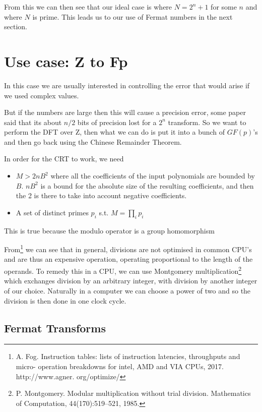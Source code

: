From this we can then see that our ideal case is where $N = 2^n + 1$ for some $n$ and where $N$ is prime. This leads us to our use of Fermat numbers in the next section.

\section{Use case: Z to Fp}\label{sec:Z-Fp}

In this case we are usually interested in controlling the error that would arise if we used complex values. 

But if the numbers are large then this will cause a precision error, some paper said that its about $n / 2$ bits of precision lost for a $2^n$ transform. So we want to perform the DFT over Z, then what we can do is put it into a bunch of $GF(p)$'s and then go back using the Chinese Remainder Theorem. 

In order for the CRT to work, we need

\begin{itemize}
\item $M > 2nB^2$ where all the coefficients of the input polynomials are bounded by $B$. $nB^2$ is a bound for the absolute size of the resulting coefficients, and then the 2 is there to take into account negative coefficients.
\item A set of distinct primes $p_i$ s.t. $M = \prod_i p_i$
\end{itemize}

This is true because the modulo operator is a group homomorphism


From\footnote{A. Fog. Instruction tables: lists of instruction latencies, throughputs and micro- operation breakdowns for intel, AMD and VIA CPUs, 2017. http://www.agner. org/optimize/} we can see that in general, divisions are not optimised in common CPU's and are thus an expensive operation, operating proportional to the length of the operands. To remedy this in a CPU, we can use Montgomery multiplication\footnote{P. Montgomery. Modular multiplication without trial division. Mathematics of Computation, 44(170):519–521, 1985.} which exchanges division by an arbitrary integer, with division by another integer of our choice. Naturally in a computer we can choose a power of two and so the division is then done in one clock cycle.


\subsection{Fermat Transforms}
\label{subsec:fermat-transforms}

